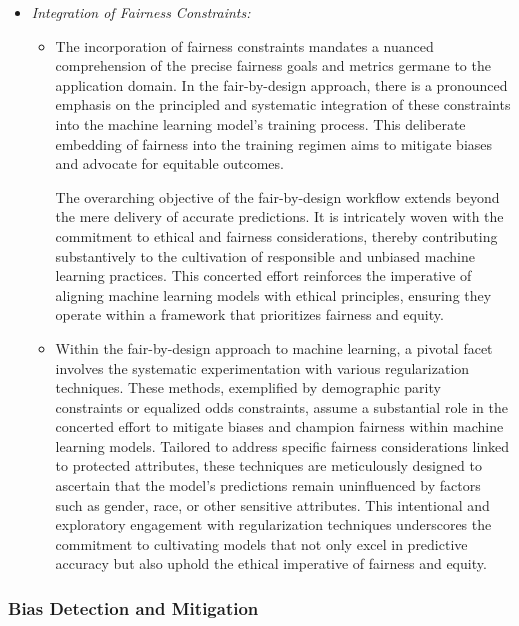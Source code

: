 \begin{itemize}

    \item \emph{Integration of Fairness Constraints:}

    \begin{itemize}

        \item The incorporation of fairness constraints mandates a nuanced comprehension of the precise fairness goals and metrics germane to the application domain. In the fair-by-design approach, there is a pronounced emphasis on the principled and systematic integration of these constraints into the machine learning model's training process. This deliberate embedding of fairness into the training regimen aims to mitigate biases and advocate for equitable outcomes.

        The overarching objective of the fair-by-design workflow extends beyond the mere delivery of accurate predictions. It is intricately woven with the commitment to ethical and fairness considerations, thereby contributing substantively to the cultivation of responsible and unbiased machine learning practices. This concerted effort reinforces the imperative of aligning machine learning models with ethical principles, ensuring they operate within a framework that prioritizes fairness and equity.

        \item Within the fair-by-design approach to machine learning, a pivotal facet involves the systematic experimentation with various regularization techniques. These methods, exemplified by demographic parity constraints or equalized odds constraints, assume a substantial role in the concerted effort to mitigate biases and champion fairness within machine learning models. Tailored to address specific fairness considerations linked to protected attributes, these techniques are meticulously designed to ascertain that the model's predictions remain uninfluenced by factors such as gender, race, or other sensitive attributes. This intentional and exploratory engagement with regularization techniques underscores the commitment to cultivating models that not only excel in predictive accuracy but also uphold the ethical imperative of fairness and equity.
    
    \end{itemize}

\end{itemize}

\subsubsection{Bias Detection and Mitigation}


